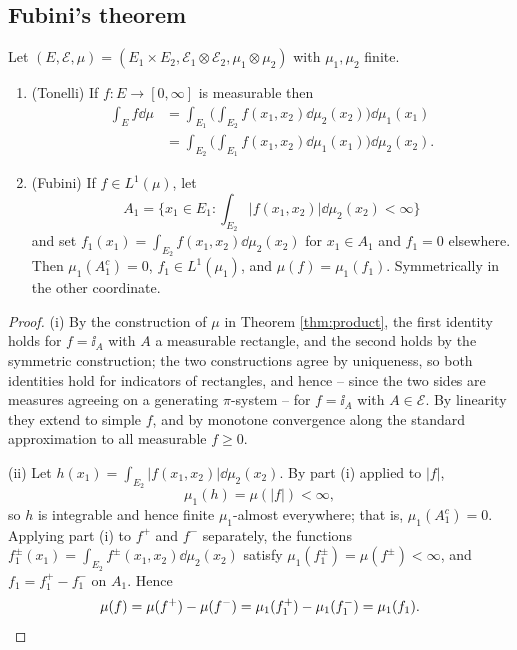 \documentclass[a4paper]{scrartcl}
\newcommand{\cE}{\mathcal{E}}
\newcommand{\ind}{\ii}
\begin{document}
\subsection{Fubini's theorem}

\begin{theorem}\label{thm:fubini}
	Let $(E,\cE,\mu) = (E_1\times E_2, \cE_1\otimes\cE_2,\mu_1\otimes\mu_2)$ with $\mu_1,\mu_2$ finite.
	\begin{enumerate}[label=(\roman*)]
		\item \textup{(Tonelli)} If $f : E \to[0,\infty]$ is measurable then
		\begin{align*}
			\int_E f\dd\mu &= \int_{E_1}\Big(\int_{E_2} f(x_1,x_2)\dd\mu_2(x_2)\Big)\dd\mu_1(x_1)\\
			&= \int_{E_2}\Big(\int_{E_1} f(x_1,x_2)\dd\mu_1(x_1)\Big)\dd\mu_2(x_2).
		\end{align*}
		\item \textup{(Fubini)} If $f \in L^1(\mu)$, let
		$$
		A_1 = \Big\{ x_1 \in E_1 : \int_{E_2}|f(x_1,x_2)|\dd\mu_2(x_2)<\infty\Big\}
		$$
		and set $f_1(x_1) = \int_{E_2}f(x_1,x_2)\dd\mu_2(x_2)$ for $x_1 \in A_1$ and $f_1 = 0$ elsewhere. Then $\mu_1(A_1^c) = 0$, $f_1 \in L^1(\mu_1)$, and $\mu(f) = \mu_1(f_1)$. Symmetrically in the other coordinate.
	\end{enumerate}
\end{theorem}
\begin{proof}
	(i) By the construction of $\mu$ in Theorem \ref{thm:product}, the first identity holds for $f = \ind_A$ with $A$ a measurable rectangle, and the second holds by the symmetric construction; the two constructions agree by uniqueness, so both identities hold for indicators of rectangles, and hence -- since the two sides are measures agreeing on a generating $\pi$-system -- for $f = \ind_A$ with $A \in \cE$. By linearity they extend to simple $f$, and by monotone convergence along the standard approximation to all measurable $f \geq 0$.

	(ii) Let $h(x_1) = \int_{E_2}|f(x_1,x_2)|\dd\mu_2(x_2)$. By part (i) applied to $|f|$,
	$$
	\mu_1(h) = \mu(|f|)<\infty,
	$$
	so $h$ is integrable and hence finite $\mu_1$-almost everywhere; that is, $\mu_1(A_1^c)=0$. Applying part (i) to $f^+$ and $f^-$ separately, the functions $f_1^\pm(x_1) = \int_{E_2}f^\pm(x_1,x_2)\dd\mu_2(x_2)$ satisfy $\mu_1(f_1^\pm) = \mu(f^\pm) < \infty$, and $f_1 = f_1^+ - f_1^-$ on $A_1$. Hence
	$$
	\mu(f) = \mu(f^+)-\mu(f^-) = \mu_1(f_1^+)-\mu_1(f_1^-) = \mu_1(f_1). \qedhere
	$$
\end{proof}
\end{document}
